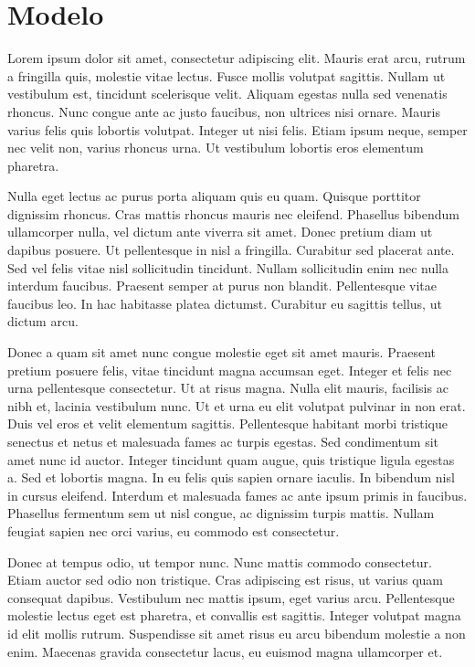 ﻿%
\chapter{Modelo}
\label{cap:modelo}

Lorem ipsum dolor sit amet, consectetur adipiscing elit. Mauris erat arcu, rutrum a fringilla quis, molestie vitae lectus. Fusce mollis volutpat sagittis. Nullam ut vestibulum est, tincidunt scelerisque velit. Aliquam egestas nulla sed venenatis rhoncus. Nunc congue ante ac justo faucibus, non ultrices nisi ornare. Mauris varius felis quis lobortis volutpat. Integer ut nisi felis. Etiam ipsum neque, semper nec velit non, varius rhoncus urna. Ut vestibulum lobortis eros elementum pharetra.

Nulla eget lectus ac purus porta aliquam quis eu quam. Quisque porttitor dignissim rhoncus. Cras mattis rhoncus mauris nec eleifend. Phasellus bibendum ullamcorper nulla, vel dictum ante viverra sit amet. Donec pretium diam ut dapibus posuere. Ut pellentesque in nisl a fringilla. Curabitur sed placerat ante. Sed vel felis vitae nisl sollicitudin tincidunt. Nullam sollicitudin enim nec nulla interdum faucibus. Praesent semper at purus non blandit. Pellentesque vitae faucibus leo. In hac habitasse platea dictumst. Curabitur eu sagittis tellus, ut dictum arcu.

Donec a quam sit amet nunc congue molestie eget sit amet mauris. Praesent pretium posuere felis, vitae tincidunt magna accumsan eget. Integer et felis nec urna pellentesque consectetur. Ut at risus magna. Nulla elit mauris, facilisis ac nibh et, lacinia vestibulum nunc. Ut et urna eu elit volutpat pulvinar in non erat. Duis vel eros et velit elementum sagittis. Pellentesque habitant morbi tristique senectus et netus et malesuada fames ac turpis egestas. Sed condimentum sit amet nunc id auctor. Integer tincidunt quam augue, quis tristique ligula egestas a. Sed et lobortis magna. In eu felis quis sapien ornare iaculis. In bibendum nisl in cursus eleifend. Interdum et malesuada fames ac ante ipsum primis in faucibus. Phasellus fermentum sem ut nisl congue, ac dignissim turpis mattis. Nullam feugiat sapien nec orci varius, eu commodo est consectetur.

Donec at tempus odio, ut tempor nunc. Nunc mattis commodo consectetur. Etiam auctor sed odio non tristique. Cras adipiscing est risus, ut varius quam consequat dapibus. Vestibulum nec mattis ipsum, eget varius arcu. Pellentesque molestie lectus eget est pharetra, et convallis est sagittis. Integer volutpat magna id elit mollis rutrum. Suspendisse sit amet risus eu arcu bibendum molestie a non enim. Maecenas gravida consectetur lacus, eu euismod magna ullamcorper et.


